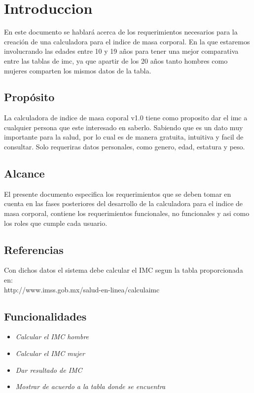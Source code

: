 \documentclass[12pt,a4paper]{article}
\begin{document}

\vspace{1 cm}
\section{Introduccion}
	En este documento se hablará acerca de los requerimientos necesarios para la creación de una calculadora para el indice de masa corporal. En la que estaremos involucrando las edades entre 10 y 19 años para tener una mejor comparativa entre las tablas de imc, ya que apartir de los 20 años tanto hombres como mujeres comparten los mismos datos de la tabla.\\
\subsection{Propósito}
	La calculadora de indice de masa coporal v1.0 tiene como proposito dar el imc a cualquier persona que este interesado en saberlo. Sabiendo que es un dato muy importante para la salud, por lo cual es de manera gratuita, intuitiva y facil de consultar. Solo requeriras datos personales, como genero, edad, estatura y peso.\\
\subsection{Alcance}
	El presente documento especifica los requerimientos que se deben tomar en cuenta en las fases posteriores del desarrollo de la calculadora para el indice de masa corporal, contiene los requerimientos funcionales, no funcionales y asi como los roles que cumple cada usuario.\\

\subsection{Referencias}
	Con dichos datos el sistema debe calcular el IMC segun la tabla proporcionada en:\\
		http://www.imss.gob.mx/salud-en-linea/calculaimc\\
	
\subsection{Funcionalidades}
\begin{itemize}
	\item\textit{Calcular el IMC hombre}
	\item\textit{Calcular el IMC mujer}
	\item\textit{Dar resultado de IMC}
	\item\textit{Mostrar de acuerdo a la tabla donde se encuentra}\\
\end{itemize}
\end{document}
